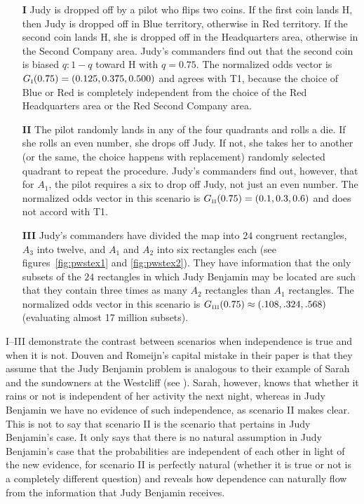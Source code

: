 \documentclass[12pt]{article}
\begin{document}
\begin{enumerate}
\item[\textbf{I}] Judy is dropped off by a pilot who flips two
  coins. If the first coin lands H, then Judy is dropped off in Blue
  territory, otherwise in Red territory. If the second coin lands H,
  she is dropped off in the Headquarters area, otherwise in the
  Second Company area. Judy's commanders find out that the second coin
  is biased $q:1-q$ toward H with $q=0.75$. The normalized odds
  vector is $G_{\mbox{\tiny I}}(0.75)=(0.125,0.375,0.500)$ and agrees
  with T1, because the choice of Blue or Red is completely independent
  from the choice of the Red Headquarters area or the Red Second
  Company area.
\item[\textbf{II}] The pilot randomly lands in any of the four
  quadrants and rolls a die. If she rolls an even number, she drops
  off Judy. If not, she takes her to another (or the same, the choice
  happens with replacement) randomly selected quadrant to repeat the
  procedure. Judy's commanders find out, however, that for $A_{1}$,
  the pilot requires a six to drop off Judy, not just an even number.
  The normalized odds vector in this scenario is $G_{\mbox{\tiny
      II}}(0.75)=(0.1,0.3,0.6)$ and does not accord with T1.
\item[\textbf{III}] Judy's commanders have divided the map into $24$
  congruent rectangles, $A_{3}$ into twelve, and $A_{1}$ and $A_{2}$
  into six rectangles each (see figures~\ref{fig:pwstex1} and
  \ref{fig:pwstex2}). They have information that the only subsets of
  the $24$ rectangles in which Judy Benjamin may be located are such
  that they contain three times as many $A_{2}$ rectangles than
  $A_{1}$ rectangles. The normalized odds vector in this scenario is
  $G_{\mbox{\tiny III}}(0.75)\approx(.108,.324,.568)$ (evaluating almost
  17 million subsets).
\end{enumerate}

{\nial}I--III demonstrate the contrast between scenarios when
independence is true and when it is not. Douven and Romeijn's capital
mistake in their paper is that they assume that the Judy Benjamin
problem is analogous to their example of Sarah and the sundowners at
the Westcliff (see ). Sarah, however,
knows that whether it rains or not is independent of her activity the
next night, whereas in Judy Benjamin we have no evidence of such
independence, as scenario II makes clear. This is not to say that
scenario II is the scenario that pertains in Judy Benjamin's case. It
only says that there is no natural assumption in Judy Benjamin's case
that the probabilities are independent of each other in light of the
new evidence, for scenario II is perfectly natural (whether it is true
or not is a completely different question) and reveals how dependence
can naturally flow from the information that Judy Benjamin receives.
\end{document}
